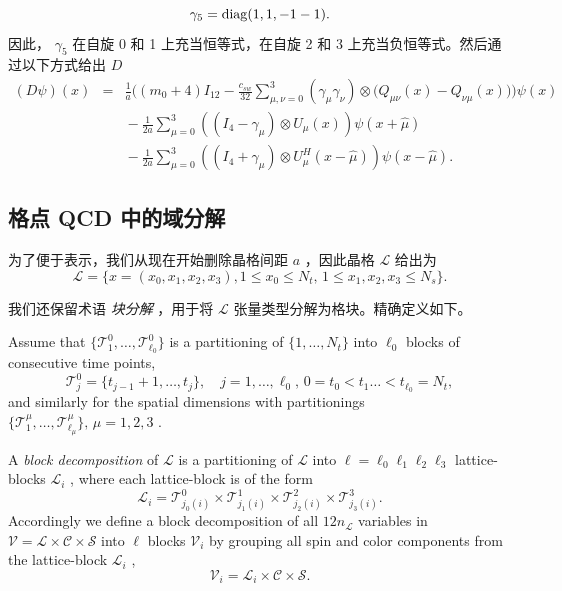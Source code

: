 \documentclass{siamltex}
\begin{document}
\[
  \gamma_5 = \diag(1,1,-1-1).
\]    因此，   $\gamma_5$    在自旋 0 和 1 上充当恒等式，在自旋 2 和 3 上充当负恒等式。然后通过以下方式给出    $D$
\begin{eqnarray*}
  (D\psi)(x) &=& \frac{1}{a} \Big( (m_0+4) I_{12} - \frac{c_{sw}}{32} \sum_{\mu,\nu=0}^3 ( \gamma_\mu \gamma_\nu ) \otimes \big( Q_{\mu\nu}(x) - Q_{\nu\mu}(x) \big) \Big) \psi(x)  \\
  & &  \mbox{} - \frac{1}{2a}\sum_{\mu=0}^3 \left( (I_4-\gamma_\mu)\otimes U_\mu(x)\right) \psi(x+\hat{\mu})  \\
  & & \mbox{} - \frac{1}{2a}\sum_{\mu=0}^3 \left( (I_4+\gamma_\mu)\otimes U_\mu^H(x-\hat{\mu})\right) \psi(x-\hat{\mu}) .
\end{eqnarray*}
\subsection{格点 QCD 中的域分解  }       \label{dd_in_lattice_qcd}    为了便于表示，我们从现在开始删除晶格间距    $a$    ，因此晶格    $\mathcal{L}$    给出为
\[
  \mathcal{L} =  \{  x = (x_0,x_1,x_2,x_3), 1 \leq x_0 \leq N_t, \, 1 \leq x_1,x_2,x_3 \leq N_s  \} .
\]

我们还保留术语  {    \em    块分解   } ，用于将    $\mathcal{L}$    张量类型分解为格块。精确定义如下。

\begin{definition}
  Assume that         $ \{  \mathcal{T}^0_{1},\ldots, \mathcal{T}^0_{\ell_0} \} $         is a partitioning of         $ \{ 1,\ldots,N_t \} $         into         $\ell_0$         blocks of consecutive time points,
  \[
    \mathcal{T}^0_{j} =  \{  t_{j-1}+1,\ldots,t_{j} \} , \quad j=1,\ldots,\ell_0, \, 0=t_0 < t_1 \ldots < t_{\ell_0} = N_t,
  \]
  and similarly for the spatial dimensions with partitionings         $ \{  \mathcal{T}^\mu_{1},\ldots, \mathcal{T}^\mu_{\ell_\mu} \} , \, \mu=1,2,3$        .

  A {\em block decomposition} of         $\mathcal{L}$         is a partitioning of         $\mathcal{L}$         into         $\ell= \ell_0\ell_1\ell_2\ell_3$         lattice-blocks         $\mathcal{L}_i$        , where each lattice-block is of the form
  \[
    \mathcal{L}_i = \mathcal{T}^0_{j_0(i)} \times \mathcal{T}^1_{j_1(i)} \times \mathcal{T}^2_{j_2(i)} \times \mathcal{T}^3_{j_3(i)}.
  \]
  Accordingly we define a block decomposition of all         $12n_\mathcal{L}$         variables in         $\mathcal{V} = \mathcal{L}\times\mathcal{C}\times\mathcal{S}$         into         $\ell$         blocks         $\mathcal{V}_i$         by grouping all spin and color components from the lattice-block         $\mathcal{L}_i$        ,
  \begin{equation} \label{eq:variable_blocks}
    \mathcal{V}_i = \mathcal{L}_i\times\mathcal{C}\times\mathcal{S}.
  \end{equation}
\end{definition}
\end{document}
